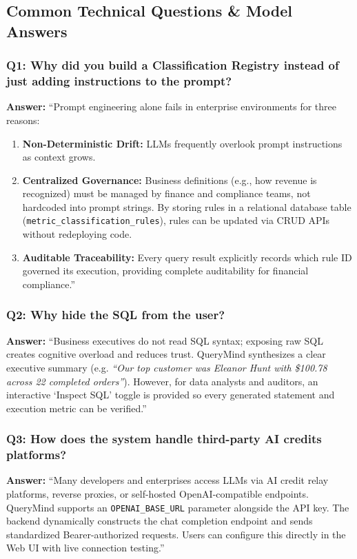 \documentclass[10pt,a4paper]{article}
\begin{document}
\subsection{Common Technical Questions \& Model Answers}

\subsubsection{Q1: Why did you build a Classification Registry instead of just adding instructions to the prompt?}
\textbf{Answer:} ``Prompt engineering alone fails in enterprise environments for three reasons:
\begin{enumerate}
    \item \textbf{Non-Deterministic Drift:} LLMs frequently overlook prompt instructions as context grows.
    \item \textbf{Centralized Governance:} Business definitions (e.g., how revenue is recognized) must be managed by finance and compliance teams, not hardcoded into prompt strings. By storing rules in a relational database table (\texttt{metric\_classification\_rules}), rules can be updated via CRUD APIs without redeploying code.
    \item \textbf{Auditable Traceability:} Every query result explicitly records which rule ID governed its execution, providing complete auditability for financial compliance.''
\end{enumerate}

\subsubsection{Q2: Why hide the SQL from the user?}
\textbf{Answer:} ``Business executives do not read SQL syntax; exposing raw SQL creates cognitive overload and reduces trust. QueryMind synthesizes a clear executive summary (e.g. \textit{``Our top customer was Eleanor Hunt with \$100.78 across 22 completed orders''}). However, for data analysts and auditors, an interactive `Inspect SQL' toggle is provided so every generated statement and execution metric can be verified.''

\subsubsection{Q3: How does the system handle third-party AI credits platforms?}
\textbf{Answer:} ``Many developers and enterprises access LLMs via AI credit relay platforms, reverse proxies, or self-hosted OpenAI-compatible endpoints. QueryMind supports an \texttt{OPENAI\_BASE\_URL} parameter alongside the API key. The backend dynamically constructs the chat completion endpoint and sends standardized Bearer-authorized requests. Users can configure this directly in the Web UI with live connection testing.''
\end{document}

